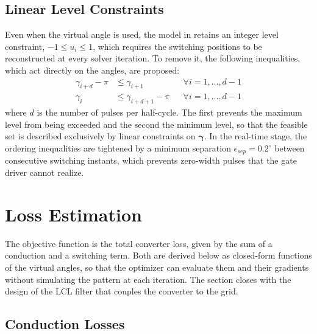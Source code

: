 \documentclass[conference]{IEEEtran}
\newcommand{\gv}{\boldsymbol{\gamma}}
\begin{document}
\subsection{Linear Level Constraints}
Even when the virtual angle is used, the model in \cite{koukoula_junction}
retains an integer level constraint, $-1 \leq u_i \leq 1$, which requires the
switching positions to be reconstructed at every solver iteration. To remove it,
the following inequalities, which act directly on the angles, are proposed:
\begin{subequations}
     \begin{align}
        \gamma_{i+d} - \pi &\leq \gamma_{i+1}
            &&\forall i = 1,\dots,d-1\\
        \gamma_{i} &\leq \gamma_{i+d+1} - \pi
            &&\forall i = 1,\dots,d-1
    \end{align}
    \label{eq:niveles}
\end{subequations}
where $d$ is the number of pulses per half-cycle. The first prevents the maximum level
from being exceeded and the second the minimum level, so that the feasible set is
described exclusively by linear constraints on $\gv$. In the real-time stage, the
ordering inequalities are tightened by a minimum separation
$\epsilon_{sep}=0.2^\circ$ between consecutive switching instants, which
prevents zero-width pulses that the gate driver cannot realize.


\section{Loss Estimation}
\label{sec:perdidas}

The objective function is the total converter loss, given by the sum of a conduction and a switching term. Both are derived below as closed-form functions
of the virtual angles, so that the optimizer can evaluate them and their
gradients without simulating the pattern at each iteration. The section closes
with the design of the LCL filter that couples the converter to the grid.

\subsection{Conduction Losses}
\end{document}
